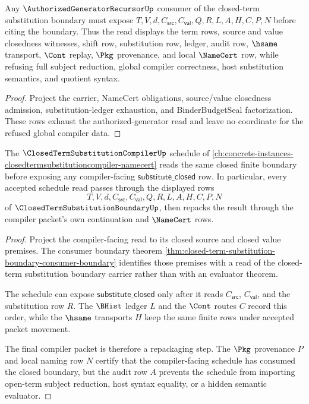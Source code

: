 \begin{theorem}
\label{thm:closed-term-substitution-boundary-authorized-generator-inversion}
Any $\AuthorizedGeneratorRecursorUp$ consumer of the closed-term substitution boundary must expose $T,V,d,C_{\mathsf{src}},C_{\mathsf{val}},Q,R,L,A,H,C,P,N$ before citing the boundary. Thus the read displays the term rows, source and value closedness witnesses, shift row, substitution row, ledger, audit row, $\hsame$ transport, $\Cont$ replay, $\Pkg$ provenance, and local $\NameCert$ row, while refusing full subject reduction, global compiler correctness, host substitution semantics, and quotient syntax.
\end{theorem}
\begin{proof}
Project the carrier, NameCert obligations, source/value closedness admission, substitution-ledger exhaustion, and BinderBudgetSeal factorization. These rows exhaust the authorized-generator read and leave no coordinate for the refused global compiler data.
\end{proof}

\begin{theorem}
\label{thm:closed-term-substitution-boundary-compiler-factorization}
The $\ClosedTermSubstitutionCompilerUp$ schedule of \autoref{ch:concrete-instances-closedtermsubstitutioncompiler-namecert} reads the same closed finite boundary before exposing any compiler-facing $\mathsf{substitute\_closed}$ row. In particular, every accepted schedule read passes through the displayed rows
$$
T,V,d,C_{\mathsf{src}},C_{\mathsf{val}},Q,R,L,A,H,C,P,N
$$
of $\ClosedTermSubstitutionBoundaryUp$, then repacks the result through the compiler packet's own continuation and $\NameCert$ rows.
\end{theorem}
\begin{proof}
Project the compiler-facing read to its closed source and closed value premises. The consumer boundary theorem \autoref{thm:closed-term-substitution-boundary-consumer-boundary} identifies those premises with a read of the closed-term substitution boundary carrier rather than with an evaluator theorem.

The schedule can expose $\mathsf{substitute\_closed}$ only after it reads $C_{\mathsf{src}}$, $C_{\mathsf{val}}$, and the substitution row $R$. The $\BHist$ ledger $L$ and the $\Cont$ routes $C$ record this order, while the $\hsame$ transports $H$ keep the same finite rows under accepted packet movement.

The final compiler packet is therefore a repackaging step. The $\Pkg$ provenance $P$ and local naming row $N$ certify that the compiler-facing schedule has consumed the closed boundary, but the audit row $A$ prevents the schedule from importing open-term subject reduction, host syntax equality, or a hidden semantic evaluator.
\end{proof}

